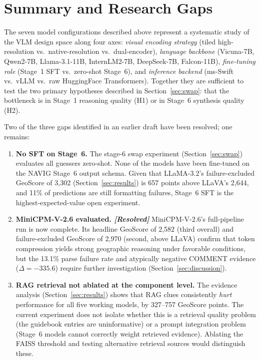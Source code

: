 \documentclass[11pt]{article}
\begin{document}
\section{Summary and Research Gaps}
\label{sec:model_summary}

The seven model configurations described above represent a systematic study of the
VLM design space along four axes: \emph{visual encoding strategy}
(tiled high-resolution vs.\ native-resolution vs.\ dual-encoder),
\emph{language backbone} (Vicuna-7B, Qwen2-7B, Llama-3.1-11B, InternLM2-7B,
DeepSeek-7B, Falcon-11B), \emph{fine-tuning role} (Stage~1 SFT vs.\ zero-shot
Stage~6), and \emph{inference backend} (ms-Swift vs.\ vLLM vs.\ raw HuggingFace
Transformers). Together they are sufficient to test the two primary hypotheses
described in Section~\ref{sec:swap}: that the bottleneck is in Stage~1 reasoning
quality (H1) or in Stage~6 synthesis quality (H2).

Two of the three gaps identified in an earlier draft have been resolved; one remains:

\begin{enumerate}[noitemsep]
  \item \textbf{No SFT on Stage~6.} The stage-6 swap experiment (Section~\ref{sec:swap})
    evaluates all guessers zero-shot. None of the models have been fine-tuned on
    the NAVIG Stage~6 output schema. Given that LLaMA-3.2's failure-excluded
    GeoScore of 3{,}302 (Section~\ref{sec:results}) is 657 points above LLaVA's
    2{,}644, and 11\% of predictions are still formatting failures, Stage~6 SFT is
    the highest-expected-value open experiment.

  \item \textbf{MiniCPM-V-2.6 evaluated. \emph{[Resolved]}} MiniCPM-V-2.6's
    full-pipeline run is now complete. Its headline GeoScore of 2{,}582 (third
    overall) and failure-excluded GeoScore of 2{,}970 (second, above LLaVA) confirm
    that token compression yields strong geographic reasoning under favorable
    conditions, but the 13.1\% parse failure rate and atypically negative COMMENT
    evidence ($\Delta = -335.6$) require further investigation
    (Section~\ref{sec:discussion}).

  \item \textbf{RAG retrieval not ablated at the component level.} The evidence
    analysis (Section~\ref{sec:results}) shows that RAG clues consistently
    \emph{hurt} performance for all five working models, by 327--757 GeoScore points.
    The current experiment does not isolate whether this is a retrieval quality
    problem (the guidebook entries are uninformative) or a prompt integration problem
    (Stage~6 models cannot correctly weight retrieved evidence). Ablating the FAISS
    threshold and testing alternative retrieval sources would distinguish these.
\end{enumerate}
\end{document}
